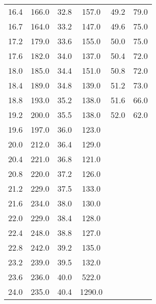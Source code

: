 \begin{table}[H]
\begin{tabular}{c c c c c c}
        16.4  &	  166.0   &  32.8	&  157.0  & 49.2  &  79.0  \\
        16.7  &	  164.0   &  33.2	&  147.0  & 49.6  &  75.0  \\
        17.2  &	  179.0   &  33.6	&  155.0  & 50.0  &  75.0  \\
        17.6  &	  182.0   &  34.0	&  137.0  & 50.4  &  72.0  \\
        18.0  &	  185.0   &  34.4	&  151.0  & 50.8  &  72.0  \\
        18.4  &	  189.0   &  34.8	&  139.0  & 51.2  &  73.0  \\
        18.8  &	  193.0   &  35.2	&  138.0  & 51.6  &  66.0  \\
        19.2  &	  200.0   &  35.5	&  138.0  & 52.0  &  62.0  \\
        19.6  &	  197.0   &  36.0	&  123.0  &       &      \\
        20.0  &	  212.0   &  36.4	&  129.0  &       &      \\
        20.4  &	  221.0   &  36.8	&  121.0  &       &      \\
        20.8  &	  220.0   &  37.2	&  126.0  &       &      \\
        21.2  &	  229.0   &  37.5	&  133.0  &       &      \\
        21.6  &	  234.0   &  38.0	&  130.0  &       &      \\
        22.0  &	  229.0   &  38.4	&  128.0  &       &      \\
        22.4  &	  248.0   &  38.8	&  127.0  &       &      \\
        22.8  &	  242.0   &  39.2	&  135.0  &       &      \\ 
        23.2  &	  239.0   &  39.5	&  132.0  &       &      \\
        23.6  &	  236.0   &  40.0	&  522.0  &       &      \\
        24.0  &	  235.0   &  40.4	&  1290.0 &       &      \\                                             
        \bottomrule
    \end{tabular}
\end{table}

